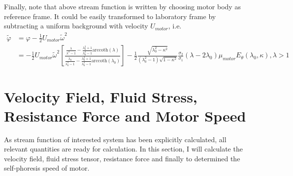 \documentclass[fontsize=11pt, %
                             paper=a4, %
                             twoside, %
                             captions=tableheading,
                             index=totoc,
                             hyperref]{labbook}
\begin{document}
Finally, note that above stream function is written by choosing motor body as reference frame. It could be easily transformed to laboratory frame by subtracting a uniform background with velocity $U_{motor}$, i.e.
\begin{equation}\label{eqn-streamfunc}
\begin{aligned}
\tilde\varphi&=\varphi-\frac{1}{2}U_{motor}\tilde{\omega}^2\\
&=-\frac{1}{2}U_{motor}\tilde{\omega}^2\left[\frac{\frac{\lambda}{\lambda^2-1}-\frac{\lambda_0^2+1}{\lambda_0^2-1}\mathrm{arccoth}(\lambda)}{\frac{\lambda_0}{\lambda_0^2-1}-\frac{\lambda_0^2+1}{\lambda_0^2-1}\mathrm{arccoth}(\lambda_0)}\right]-\frac{1}{2}\frac{\sqrt{\lambda_0^2-\kappa^2}}{(\lambda_0^2-1)\sqrt{1-\kappa^2}}\frac{\sigma_2}{\sigma_1}(\lambda-2\lambda_0)\mu_{motor}E_\theta(\lambda_0,\kappa), \lambda>1
\end{aligned}
\end{equation}
\section{Velocity Field, Fluid Stress, Resistance Force and Motor Speed}
As stream function of interested system has been explicitly calculated, all relevant quantities are ready for calculation. In this section, I will calculate the velocity field, fluid stress tensor, resistance force and finally to determined the self-phoresis speed of motor.
\end{document}

